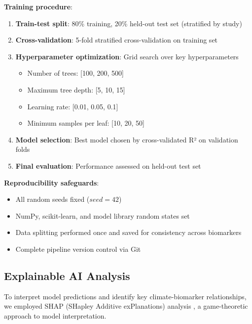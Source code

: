 \textbf{Training procedure}:
\begin{enumerate}
    \item \textbf{Train-test split}: 80\% training, 20\% held-out test set (stratified by study)
    \item \textbf{Cross-validation}: 5-fold stratified cross-validation on training set
    \item \textbf{Hyperparameter optimization}: Grid search over key hyperparameters
    \begin{itemize}
        \item Number of trees: [100, 200, 500]
        \item Maximum tree depth: [5, 10, 15]
        \item Learning rate: [0.01, 0.05, 0.1]
        \item Minimum samples per leaf: [10, 20, 50]
    \end{itemize}
    \item \textbf{Model selection}: Best model chosen by cross-validated R² on validation folds
    \item \textbf{Final evaluation}: Performance assessed on held-out test set
\end{enumerate}

\textbf{Reproducibility safeguards}:
\begin{itemize}
    \item All random seeds fixed ($seed=42$)
    \item NumPy, scikit-learn, and model library random states set
    \item Data splitting performed once and saved for consistency across biomarkers
    \item Complete pipeline version control via Git
\end{itemize}

\subsection{Explainable AI Analysis}

To interpret model predictions and identify key climate-biomarker relationships, we employed SHAP (SHapley Additive exPlanations) analysis \citep{lundberg2017unified}, a game-theoretic approach to model interpretation.

